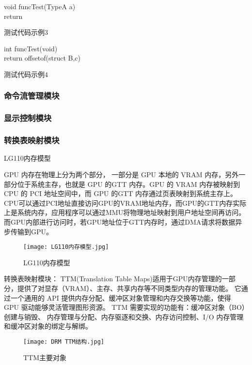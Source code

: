 \begin{minipage}{0.45\textwidth}
  \begin{algorithm}[H]
    \SetAlgoLined
    void funcTest(TypeA a){\\
      return \;
    }
    \caption{测试代码示例3}
    \label{algo:algorithm4}
  \end{algorithm}
\end{minipage}
\hfill
\begin{minipage}{0.45\textwidth}
  \begin{algorithm}[H]
    \SetAlgoLined
    int funcTest(void){\\
      return offsetof(struct B,c) \;
    }
    \caption{测试代码示例4}
    \label{algo:algorithm5}
  \end{algorithm}
\end{minipage}

\subsubsection{命令流管理模块}
\subsubsection{显示控制模块}
\subsubsection{转换表映射模块}
LG110内存模型

GPU 内存在物理上分为两个部分，
一部分是 GPU 本地的 VRAM 内存，另外一部分位于系统主存，也就是 GPU 的GTT 内存。GPU 的 VRAM 内存被映射到 CPU 的 PCI 地址空间中，而 GPU 的GTT 内存通过页表映射到系统主存上。
CPU可以通过PCI地址直接访问GPU的VRAM地址内存，而GPU的GTT内存实际上是系统内存，应用程序可以通过MMU将物理地址映射到用户地址空间再访问。
而GPU内部进行访问时，若GPU地址位于GTT内存时，通过DMA请求将数据异步传输到GPU。
\begin{figure}[h]
  \centering
  \texttt{[image: LG110内存模型.jpg]}
  \caption{LG110内存模型}
\end{figure}
转换表映射模块：
TTM(Translation Table Maps)适用于GPU内存管理的一部分，提供了对显存（VRAM）、主存、共享内存等不同类型内存的管理功能。
它通过一个通用的 API 提供内存分配、缓冲区对象管理和内存交换等功能，使得 GPU 驱动能够灵活管理图形资源。
TTM 需要实现的功能有：缓冲区对象（BO）创建与销毁、 内存管理与分配、内存驱逐和交换、内存访问控制、I/O 内存管理和缓冲区对象的绑定与解绑。
\begin{figure}[h]
  \centering
  \texttt{[image: DRM TTM结构.jpg]}
  \caption{TTM主要对象}
\end{figure}

